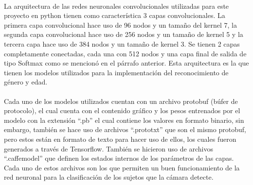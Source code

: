 \documentclass[9pt]{report}
\begin{document}
\begin{multicols}{2}
	\paragraph{}
	La arquitectura de las redes neuronales convolucionales utilizadas para este proyecto en python tienen como característica 3 capas convolucionales. La primera capa convolucional hace uso de 96 nodos y un tamaño del kernel 7, la segunda capa convolucional hace uso de 256 nodos y un tamaño de kernel 5 y la tercera capa hace uso de 384 nodos y un tamaño de kernel 3. Se tienen 2 capas completamente conectadas, cada una con 512 nodos y una capa final de salida de tipo Softmax como se mencionó en el párrafo anterior. Esta arquitectura es la que tienen los modelos utilizados para la implementación del reconocimiento de género y edad.
	\paragraph{}
	Cada uno de los modelos utilizados cuentan con un archivo protobuf (búfer de protocolo), el cual cuenta con el contenido gráfico y los pesos entrenados por el modelo con la extensión “.pb” el cual contiene los valores en formato binario, sin embargo, también se hace uso de archivos “.prototxt” que son el mismo protobuf, pero estos están en formato de texto para hacer uso de ellos, los cuales fueron generados a través de Tensorflow. También se hicieron uso de archivos “.caffemodel” que definen los estados internos de los parámetros de las capas. Cada uno de estos archivos son los que permiten un buen funcionamiento de la red neuronal para la clasificación de los sujetos que la cámara detecte.

\end{multicols}
\end{document}
